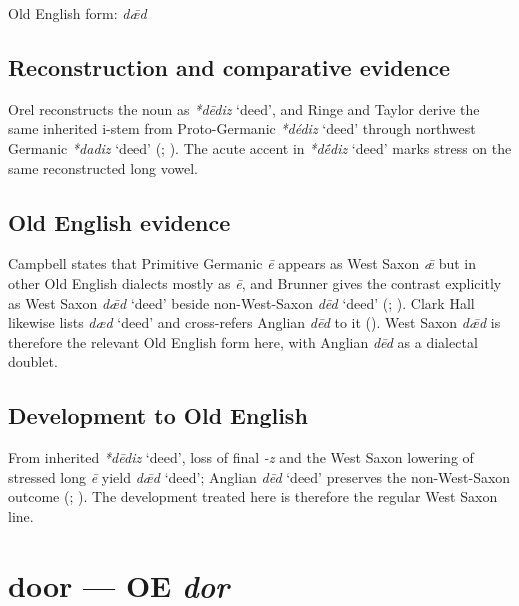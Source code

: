 \documentclass[
  british,
  a4paper,
  openany]{book}
\providecommand{\Recon}[1]{\emph{*#1}}
{\catcode`→=\active \global\def→{\ensuremath{\rightarrow}}}
\providecommand{\texorpdfstring}[2]{#1}
\providecommand{\Recon}[1]{\emph{*#1}}
{\catcode`→=\active \global\def→{\ensuremath{\rightarrow}}}
\begin{document}
Old English form: \emph{dǣd}

\subsection{Reconstruction and comparative
evidence}\label{reconstruction-and-comparative-evidence-12}

Orel reconstructs the noun as \Recon{dēdiz} `deed', and Ringe and Taylor
derive the same inherited i-stem from Proto-Germanic \Recon{dédiz}
`deed' through northwest Germanic \Recon{dadiz} `deed'
(;
). The acute accent
in \Recon{dḗdiz} `deed' marks stress on the same reconstructed long
vowel.

\subsection{Old English evidence}\label{old-english-evidence-12}

Campbell states that Primitive Germanic \emph{ē} appears as West Saxon
\emph{ǣ} but in other Old English dialects mostly as \emph{ē}, and
Brunner gives the contrast explicitly as West Saxon \emph{dǣd} `deed'
beside non-West-Saxon \emph{dēd} `deed'
(;
). Clark Hall likewise
lists \emph{dæd} `deed' and cross-refers Anglian \emph{dēd} to it
(). West Saxon \emph{dǣd}
is therefore the relevant Old English form here, with Anglian \emph{dēd}
as a dialectal doublet.

\subsection{Development to Old
English}\label{development-to-old-english-12}

From inherited \Recon{dēdiz} `deed', loss of final \emph{-z} and the
West Saxon lowering of stressed long \emph{ē} yield \emph{dǣd} `deed';
Anglian \emph{dēd} `deed' preserves the non-West-Saxon outcome
(;
). The development
treated here is therefore the regular West Saxon line.

\section{\texorpdfstring{door --- OE
\emph{dor}}{door --- OE dor}}\label{door-oe-dor}
\end{document}
